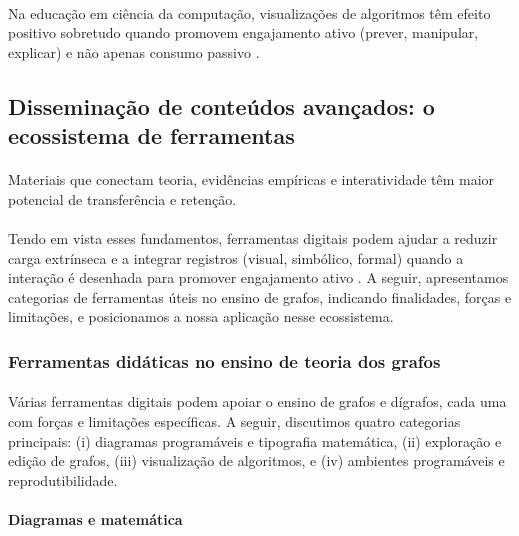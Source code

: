 \documentclass[12pt,a4paper]{article}
\def\emph#1{#1}%
\begin{document}
\paragraph{}
Na educação em ciência da computação, visualizações de algoritmos têm efeito positivo sobretudo quando promovem \emph{engajamento ativo} (prever, manipular, explicar) e não apenas consumo passivo \cite{hundhausen2002meta,naps2003engagement}.

\subsection{Disseminação de conteúdos avançados: o ecossistema de ferramentas}

\paragraph{}
Materiais que conectam teoria, evidências empíricas e interatividade têm maior potencial de transferência e retenção. 

\paragraph{}
Tendo em vista esses fundamentos, ferramentas digitais podem ajudar a reduzir carga extrínseca e a integrar registros (visual, simbólico, formal) quando a interação é desenhada para promover \emph{engajamento ativo} \cite{mayer2009multimedia,sweller1988cognitive,hundhausen2002meta,naps2003engagement}. A seguir, apresentamos categorias de ferramentas úteis no ensino de grafos, indicando finalidades, forças e limitações, e posicionamos a nossa aplicação nesse ecossistema.

\subsubsection{Ferramentas didáticas no ensino de teoria dos grafos}
\paragraph{}
Várias ferramentas digitais podem apoiar o ensino de grafos e dígrafos, cada uma com forças e limitações específicas. A seguir, discutimos quatro categorias principais: (i) diagramas programáveis e tipografia matemática, (ii) exploração e edição de grafos, (iii) visualização de algoritmos, e (iv) ambientes programáveis e reprodutibilidade.

\paragraph{Diagramas e matemática}
\end{document}
